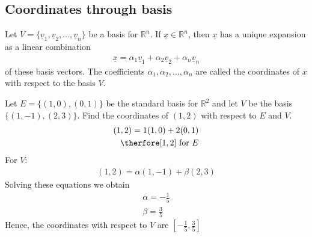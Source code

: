 \documentclass[a4paper]{article}
\theoremstyle{plain}
\theoremstyle{definition}
\newtheorem{defn}{Definition}[section]
\newtheorem{exmp}{Example}[section]
\theoremstyle{remark}
\begin{document}
\subsection{Coordinates through basis}
\begin{tcolorbox}[colback=black!3!white,colframe=black!60!white,title=\begin{defn}Coordinates \label{Coordinates}\end{defn}]
Let $V = \{\underline{v}_1, \underline{v}_2, \ldots,\underline{v}_n\}$ be a basis for $\mathbb{R}^{n}$. If $\underline{x} \in \mathbb{R}^{n}$, then $\underline{x}$ has a unique expansion as a linear combination
\begin{align}
\underline{x} = \alpha_1\underline{v}_1 + \alpha_2\underline{v}_2 + \alpha_n \underline{v}_n
\end{align}
of these basis vectors. The coefficients $\alpha_1,\alpha_2,\ldots,\alpha_n$ are called the coordinates of $\underline{x}$ with respect to the basis $V $.
\end{tcolorbox}
\begin{tcolorbox}[colback=black!3!white,colframe=black!60!white,title=\begin{exmp}Example 1 \label{Example 1}\end{exmp}]
        Let $E = \{(1,0),(0,1)\}$ be the standard basis for $\mathbb{R}^2$ and let $V$ be the basis $\{(1,-1),(2,3)\}$. Find the coordinates of $(1,2)$ with respect to $E$ and $V$.
                \begin{align}
			(1,2) = 1(1,0)+2(0,1)\\
			\therfore [1,2] \text{ for $E$} \\
                \end{align}
	For $V$:
	\begin{align}
		(1,2) = \alpha(1,-1)+\beta(2,3)
	\end{align}
	Solving these equations we obtain
	\begin{align}
		\alpha = -\frac{1}{5} \\
		\beta = \frac{3}{5}
	\end{align}
	Hence, the coordinates with respect to $V$ are $\left[-\frac{1}{5},\frac{3}{5}\right]$
\end{tcolorbox}
\end{document}
